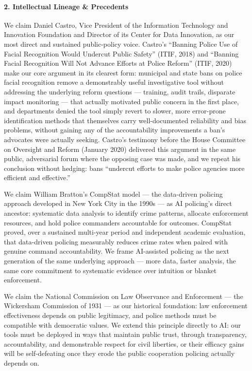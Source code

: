 \paragraph{2. Intellectual Lineage \&
Precedents}\label{intellectual-lineage-precedents-26}

We claim Daniel Castro, Vice President of the Information Technology and
Innovation Foundation and Director of its Center for Data Innovation, as
our most direct and sustained public-policy voice. Castro's ``Banning
Police Use of Facial Recognition Would Undercut Public Safety'' (ITIF,
2018) and ``Banning Facial Recognition Will Not Advance Efforts at
Police Reform'' (ITIF, 2020) make our core argument in its clearest
form: municipal and state bans on police facial recognition remove a
demonstrably useful investigative tool without addressing the underlying
reform questions --- training, audit trails, disparate impact monitoring
--- that actually motivated public concern in the first place, and
departments denied the tool simply revert to slower, more error-prone
identification methods that themselves carry well-documented reliability
and bias problems, without gaining any of the accountability
improvements a ban's advocates were actually seeking. Castro's testimony
before the House Committee on Oversight and Reform (January 2020)
delivered this argument in the same public, adversarial forum where the
opposing case was made, and we repeat his conclusion without hedging:
bans ``undercut efforts to make police agencies more efficient and
effective.''

We claim William Bratton's CompStat model --- the data-driven policing
approach developed in New York City in the 1990s --- as AI policing's
direct ancestor: systematic data analysis to identify crime patterns,
allocate enforcement resources, and hold police commanders accountable
for outcomes. CompStat proved, over a sustained multi-year period and
independent academic evaluation, that data-driven policing measurably
reduces crime rates when paired with genuine command accountability. We
frame AI-assisted policing as the next generation of the same underlying
approach --- more data, faster analysis, the same core commitment to
systematic evidence over intuition or blanket enforcement.

We claim the National Commission on Law Observance and Enforcement ---
the Wickersham Commission of 1931 --- as our historical foundation: law
enforcement effectiveness depends on public legitimacy, and police
methods must be compatible with democratic values. We extend this
principle directly to AI: our tools must be deployed in ways that
maintain public trust, through transparency, accountability, and
demonstrable respect for civil liberties, or their efficacy gains will
be self-defeating once they erode the public cooperation policing
actually depends on.

